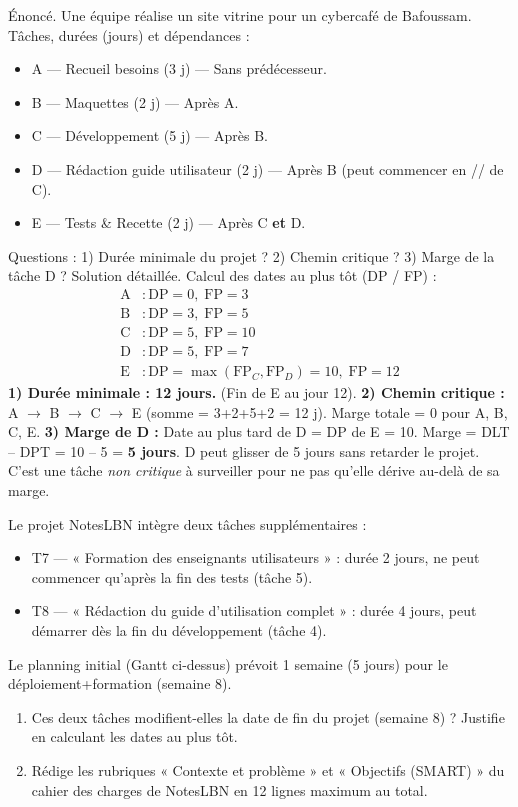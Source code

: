 \documentclass[11pt]{article}
\begin{document}
\begin{exoresolu}
Énoncé. Une équipe réalise un site vitrine pour un cybercafé de Bafoussam. Tâches, durées (jours) et dépendances :
\begin{itemize}
\item A — Recueil besoins (3 j) — Sans prédécesseur.
\item B — Maquettes (2 j) — Après A.
\item C — Développement (5 j) — Après B.
\item D — Rédaction guide utilisateur (2 j) — Après B (peut commencer en // de C).
\item E — Tests \& Recette (2 j) — Après C \textbf{et} D.
\end{itemize}
Questions : 1) Durée minimale du projet ? 2) Chemin critique ? 3) Marge de la tâche D ?
\tcblower
Solution détaillée. Calcul des dates au plus tôt (DP / FP) :
\begin{align*}
\text{A} &: \text{DP}=0,\; \text{FP}=3 \\
\text{B} &: \text{DP}=3,\; \text{FP}=5 \\
\text{C} &: \text{DP}=5,\; \text{FP}=10 \\
\text{D} &: \text{DP}=5,\; \text{FP}=7 \\
\text{E} &: \text{DP}=\max(\text{FP}_C, \text{FP}_D)=10,\; \text{FP}=12
\end{align*}
\textbf{1) Durée minimale : 12 jours.} (Fin de E au jour 12).
\textbf{2) Chemin critique :} A $\rightarrow$ B $\rightarrow$ C $\rightarrow$ E (somme = 3+2+5+2 = 12 j). Marge totale = 0 pour A, B, C, E.
\textbf{3) Marge de D :} Date au plus tard de D = DP de E = 10. Marge = DLT -- DPT = 10 -- 5 = \textbf{5 jours}. D peut glisser de 5 jours sans retarder le projet. C'est une tâche \emph{non critique} à surveiller pour ne pas qu'elle dérive au-delà de sa marge.
\end{exoresolu}

\begin{exercice}
Le projet NotesLBN intègre deux tâches supplémentaires :
\begin{itemize}
\item T7 — « Formation des enseignants utilisateurs » : durée 2 jours, ne peut commencer qu'après la fin des tests (tâche 5).
\item T8 — « Rédaction du guide d'utilisation complet » : durée 4 jours, peut démarrer dès la fin du développement (tâche 4).
\end{itemize}
Le planning initial (Gantt ci-dessus) prévoit 1 semaine (5 jours) pour le déploiement+formation (semaine 8).
\begin{enumerate}
\item Ces deux tâches modifient-elles la date de fin du projet (semaine 8) ? Justifie en calculant les dates au plus tôt.
\item Rédige les rubriques « Contexte et problème » et « Objectifs (SMART) » du cahier des charges de NotesLBN en 12 lignes maximum au total.
\end{enumerate}
\end{exercice}
\end{document}
